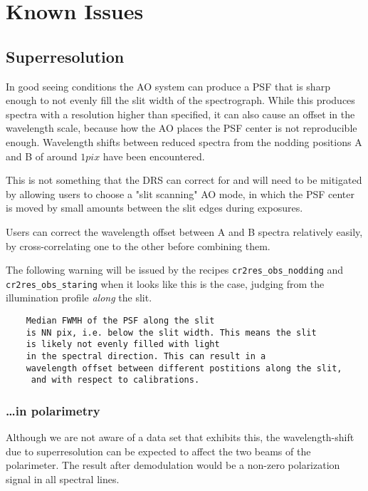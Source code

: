 \section{Known Issues}
\label{sec:knownissues}

\subsection{Superresolution}

In good seeing conditions the AO system can produce a PSF that is sharp enough
to not evenly fill the slit width of the spectrograph. While this produces
spectra with a resolution higher than specified, it can also cause an offset in
the wavelength scale, because how the AO places the PSF center is not
reproducible enough. Wavelength shifts between reduced spectra from the nodding
positions A and B of around $1 pix$ have been encountered.

This is not something that the DRS can correct for and will need to be mitigated
by allowing users to choose a "slit scanning" AO mode, in which the PSF center
is moved by small amounts between the slit edges during exposures.

Users can correct the wavelength offset between A and B spectra relatively
easily, by cross-correlating one to the other before combining them.

The following warning will be issued by the recipes \verb!cr2res_obs_nodding!
and \verb!cr2res_obs_staring! when it looks like this is the case, judging from
the illumination profile \emph{along} the slit. 
\begin{verbatim}
    Median FWMH of the PSF along the slit 
    is NN pix, i.e. below the slit width. This means the slit 
    is likely not evenly filled with light 
    in the spectral direction. This can result in a 
    wavelength offset between different postitions along the slit,
     and with respect to calibrations.
\end{verbatim}

\subsubsection{\ldots in polarimetry}

Although we are not aware of a data set that exhibits this, the wavelength-shift
due to superresolution can be expected to affect the two beams of the
polarimeter. The result after demodulation would be a non-zero polarization
signal in all spectral lines.

